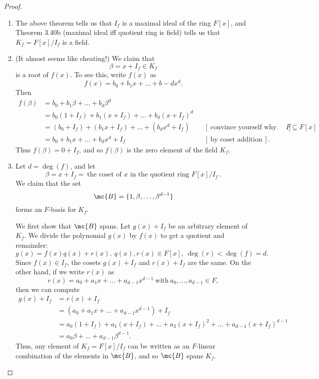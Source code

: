 \documentclass[math1530-lecture-notes]{subfiles}
\begin{document}
\begin{proof}[Proof]
  \begin{enumerate}
    \item The above theorem tells us that $I_f$ is a maximal ideal of the ring $F[x]$, and Theorem
      3.40b (maximal ideal iff quotient ring is field) tells us that $K_f=F[x] / I_f$ is a field.
    \item (It almost seems like cheating!) We claim that \[
      \beta=x+I_f\in K_f
    \] is a root of $f(x)$. To see this, write $f(x)$ as \[
      f(x)=b_0+b_1x+\ldots+b-dx^d
    .\] Then
      \begin{align*}
        f(\beta)&= b_0+b_1\beta+\ldots+b_d\beta^d \\
              &= b_0(1+I_f)+b_1(x+I_f)+\ldots+b_d(x+I_f)^d \\
              &= (b_0+I_f)+(b_1x+I_f)+\ldots+(b_dx^d+I_f) && [~\text{convince yourself why this is
              true, given the properties of ideals and the fact that $F\subseteq F[x]$}~]\\
              &= b_0+b_1x+\ldots+b_dx^d+I_f && [~\text{by coset addition}~]
      .\end{align*}
      Thus $f(\beta)=0+I_f$, and so $f(\beta)$ is the zero element of the field $K_f$.
    \item Let $d=\deg(f)$, and let \[
        \beta=x+I_f=~\text{the coset of $x$ in the quotient ring $F[x] / I_f$}~
      .\] We claim that the set \[
        \mc{B}=\{ 1,\beta,\ldots,\beta^{d-1} \}
      \] forms an $F$-basis for $K_f$.

      We first show that $\mc{B}$ spans. Let $g(x)+I_f$ be an arbitrary element of $K_f$. We divide
      the polynomial $g(x)$ by $f(x)$ to get a quotient and remainder: \[
        g(x)=f(x)q(x)+r(x),\ q(x),r(x)\in F[x],\ \deg(r)<\deg(f)=d
      .\] Since $f(x)\in I_f$, the cosets $g(x)+I_f$ and $r(x)+I_f$ are the same. On the other hand,
      if we write $r(x)$ as \[
        r(x)=a_0+a_1x+\ldots+a_{d-1}x^{d-1} ~\text{with}~ a_0,\ldots,a_{d-1}\in F
      ,\] then we can compute
      \begin{align*}
        g(x)+I_f &= r(x)+I_f \\
                 &= (a_0+a_1x+\ldots+a_{d-1}x^{d-1})+I_f\\
                 &= a_0(1+I_f)+a_1(x+I_f)+\ldots+a_2(x+I_f)^2+\ldots+a_{d-1}(x+I_f)^{d-1} \\
                 &= a_0\beta+\ldots+a_{d-1}\beta^{d-1}
      .\end{align*}
      Thus, any element of $K_f=F[x] / I_f$ can be written as an $F$-linear combination of the
      elements in $\mc{B}$, and so $\mc{B}$ spans $K_f$.


\end{enumerate}
\end{proof}
\end{document}
